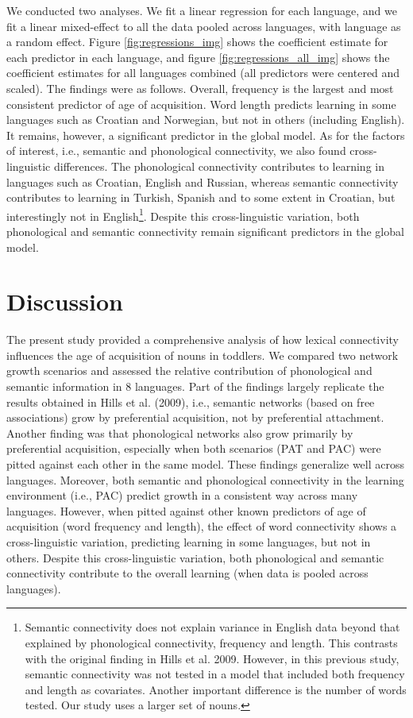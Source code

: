 \documentclass[10pt, letterpaper]{article}
\begin{document}
We conducted two analyses. We fit a linear regression for each language,
and we fit a linear mixed-effect to all the data pooled across
languages, with language as a random effect. Figure
\ref{fig:regressions_img} shows the coefficient estimate for each
predictor in each language, and figure \ref{fig:regressions_all_img}
shows the coefficient estimates for all languages combined (all
predictors were centered and scaled). The findings were as follows.
Overall, frequency is the largest and most consistent predictor of age
of acquisition. Word length predicts learning in some languages such as
Croatian and Norwegian, but not in others (including English). It
remains, however, a significant predictor in the global model. As for
the factors of interest, i.e., semantic and phonological connectivity,
we also found cross-linguistic differences. The phonological
connectivity contributes to learning in languages such as Croatian,
English and Russian, whereas semantic connectivity contributes to
learning in Turkish, Spanish and to some extent in Croatian, but
interestingly not in
English\footnote{Semantic connectivity does not explain variance in English data beyond that explained by phonological connectivity, frequency and length. This contrasts with the original finding in Hills et al. 2009. However, in this previous study, semantic connectivity was not tested in a model that included both frequency and length as covariates. Another important difference is the number of words tested. Our study uses a larger set of nouns.}.
Despite this cross-linguistic variation, both phonological and semantic
connectivity remain significant predictors in the global model.

\section{Discussion}\label{discussion}

The present study provided a comprehensive analysis of how lexical
connectivity influences the age of acquisition of nouns in toddlers. We
compared two network growth scenarios and assessed the relative
contribution of phonological and semantic information in 8 languages.
Part of the findings largely replicate the results obtained in Hills et
al. (2009), i.e., semantic networks (based on free associations) grow by
preferential acquisition, not by preferential attachment. Another
finding was that phonological networks also grow primarily by
preferential acquisition, especially when both scenarios (PAT and PAC)
were pitted against each other in the same model. These findings
generalize well across languages. Moreover, both semantic and
phonological connectivity in the learning environment (i.e., PAC)
predict growth in a consistent way across many languages. However, when
pitted against other known predictors of age of acquisition (word
frequency and length), the effect of word connectivity shows a
cross-linguistic variation, predicting learning in some languages, but
not in others. Despite this cross-linguistic variation, both
phonological and semantic connectivity contribute to the overall
learning (when data is pooled across languages).
\end{document}
